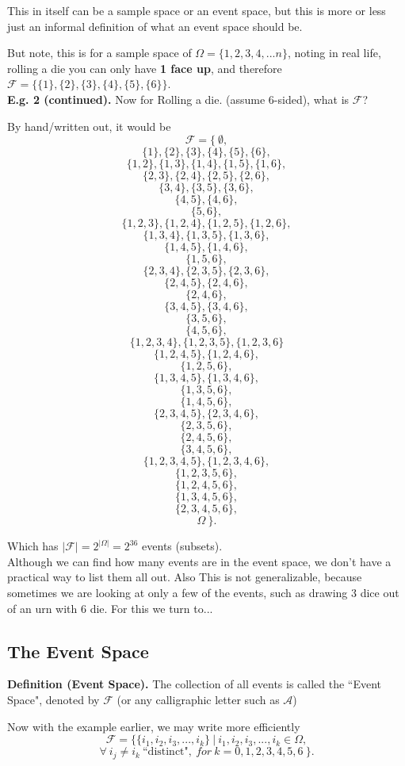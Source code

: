 \documentclass[12pt]{book}
\begin{document}
This in itself can be a sample space or an event space, but this is more or less just an informal definition of what an event space should be.

But note, this is for a sample space of $\Omega = \{ 1,2,3,4,...n \}$, noting in real life, rolling a die you can only have \textbf{1 face up}, and therefore $\mathcal{F}= \{ \{1\}, \{2\}, \{3\}, \{4\}, \{5\}, \{6\} \}$.\\

\noindent \textbf{E.g. 2 (continued). } Now for Rolling a die. (assume 6-sided), what is $\mathcal{F}$?

By hand/written out, it would be 
$$\mathcal{F}= \Big\{ ~\emptyset,$$
$$\{1\}, \{2\}, \{3\}, \{4\}, \{5\}, \{6\},$$
$$~$$
$$\{1,2\}, \{1,3\}, \{1,4\}, \{1,5\}, \{1,6\}, $$ 
$$\{2,3\}, \{2,4\}, \{2,5\}, \{2,6\},  $$
$$\{3,4\}, \{3,5\}, \{3,6\},  $$
$$\{4,5\}, \{4,6\},  $$
$$\{5,6\},  $$
$$~$$
$$\{1,2,3\}, \{1,2,4\}, \{1,2,5\}, \{1,2,6\},  $$
$$\{1,3,4\}, \{1,3,5\}, \{1,3,6\}, $$
$$\{1,4,5\}, \{1,4,6\}, $$
$$\{1,5,6\},$$
$$\{2,3,4\}, \{2,3,5\},  \{2,3,6\},  $$
$$\{2,4,5\}, \{2,4,6\},$$
$$\{2,4,6\},$$
$$\{3,4,5\}, \{3,4,6\},$$
$$\{3,5,6\}, $$
$$\{4,5,6\},$$
$$~$$
$$\{1,2,3,4\}, \{1,2,3,5\}, \{1,2,3,6\}$$
$$\{1,2,4,5\}, \{1,2,4,6\},$$
$$\{1,2,5,6\},$$
$$\{1,3,4,5\}, \{1,3,4,6\},$$
$$\{1,3,5,6\},$$
$$\{1,4,5,6\},$$
$$\{2,3,4,5\}, \{2,3,4,6\}, $$
$$\{2,3,5,6\},  $$
$$\{2,4,5,6\}, $$
$$\{3,4,5,6\},$$
$$~$$
$$\{1,2,3,4,5\}, \{1,2,3,4,6\}, $$
$$\{1,2,3,5,6\}, $$
$$\{1,2,4,5,6\}, $$
$$\{1,3,4,5,6\}, $$
$$\{2,3,4,5,6\},$$
$$\Omega ~\Big\}.$$

\noindent Which has $|\mathcal{F}| = 2^{|\Omega|} = 2^{36}$ events (subsets).\\

Although we can find how many events are in the event space, we don't have a practical way to list them all out. Also This is not generalizable, because sometimes we are looking at only a few of the events, such as drawing 3 dice out of an urn with 6 die. For this we turn to...

\subsection{The Event Space}

\textbf{Definition (Event Space). } The collection of all events is called the ``Event Space", denoted by $\mathcal{F}$ (or any calligraphic letter such as $\mathcal{A}$)

Now with the example earlier, we may write more efficiently
$$\mathcal{F}=\Big\{ \{i_1, i_2, i_3, ..., i_k\} ~\Big|~ i_1, i_2, i_3, ..., i_k\in\Omega,$$
$$\forall~ i_j \neq i_k ~ \text{``distinct"}, ~ for ~ k=0,1,2,3,4,5,6~ \Big\}.$$
\end{document}
